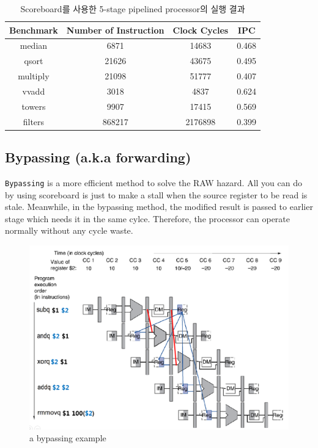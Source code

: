 \documentclass{article}
\begin{document}

\begin{table}[h]
\centering
\begin{tabular}{|c|c|c|c|}
\hline
Benchmark & Number of Instruction & Clock Cycles & IPC \\
\hline
median & 6871 & 14683 & 0.468\\
qsort & 21626 & 43675 & 0.495\\ 
multiply & 21098 & 51777 & 0.407\\
vvadd & 3018 & 4837 & 0.624\\
towers & 9907 & 17415  & 0.569\\
filters & 868217 & 2176898 & 0.399\\
\hline
\end{tabular}
\caption{Scoreboard를 사용한 5-stage pipelined processor의 실행 결과}
\end{table}

\newpage
\subsection{Bypassing (a.k.a forwarding)}

\texttt{Bypassing} is a more efficient method to solve the RAW hazard. All you can do by using
scoreboard is just to make a stall when the source register to be read is stale.
Meanwhile, in the bypassing method, the modified result is passed to earlier stage which needs
it in the same cylce. Therefore, the processor can operate normally without any cycle waste.

\begin{figure}[htbp]
	\begin{center}
		\includegraphics[scale=0.3]{forwarding.png}
		\caption{a bypassing example}
		\label{fig:2pipe_proc}
	\end{center}
\end{figure}
\end{document}
